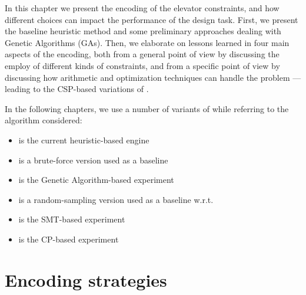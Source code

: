 In this chapter we present the encoding of the elevator constraints,
and how different choices can impact the performance of the design
task. First, we present the baseline heuristic method and some preliminary
approaches dealing with Genetic Algorithms (GAs). Then, we elaborate on 
lessons learned in four main aspects of the encoding, both from a general
point of view by discussing the employ of different kinds of constraints, 
and from a specific point of view by discussing how arithmetic and 
optimization techniques can handle the problem --- leading to the CSP-based
variations of \liftcreate.

In the following chapters, we use a number of variants of \liftcreate{}
while referring to the algorithm considered:
\begin{itemize}
	\item \liftcreatehr{} is the current heuristic-based engine
	\item \liftcreatebf{} is a brute-force version used as a baseline
	\item \liftcreatega{} is the Genetic Algorithm-based experiment
	\item \liftcreaters{} is a random-sampling version used as a 
		baseline w.r.t. \liftcreatega
	\item \liftcreatesmt{} is the SMT-based experiment
	\item \liftcreatecp{} is the CP-based experiment
\end{itemize}

\section{Encoding strategies}
\label{sec:solutions}

